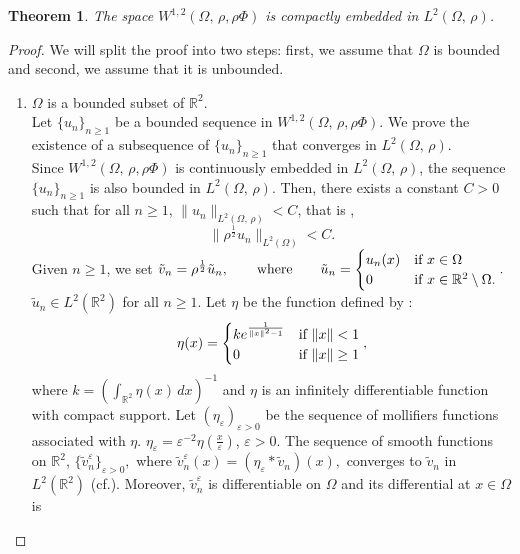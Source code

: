 \documentclass[11pt]{article}
\newtheorem{theorem}{Theorem}
\begin{document}
\begin{theorem}\label{th1}
	The space	$W^{1,2}(\Omega,\,  \rho, \rho \Phi)$ is compactly embedded in $L^2(\Omega,\,  \rho)$.
\end{theorem}
\begin{proof} We will split the proof into two steps: first, we assume that $\Omega$ is bounded and second, we assume that it is unbounded.
	\begin{enumerate}
		\item[Step 1.] $\Omega$ is a bounded subset of $\mathbb{R}^2$.\\
		Let $\{u_n\}_{n \geq 1}$ be a bounded sequence in $W^{1,2}(\Omega,\,  \rho, \rho \Phi)$. We prove the existence of a subsequence of $\{u_n\}_{n \geq 1}$ that converges in  $L^2(\Omega,\,  \rho)$.\\		
		Since $ W^{1,2}(\Omega,\,  \rho, \rho \Phi)$ is continuously embedded in $L^2(\Omega,\,  \rho)$, the sequence $\{u_n\}_{n \geq 1}$ is also bounded in $L^2(\Omega,\,  \rho)$. Then, there exists a constant  $C > 0$ such that for all $n \geq 1$, $\lVert u_n \rVert_{L^2(\Omega,\,  \rho)} < C$, that is ,
		\begin{equation}\label{3eq1}
			\lVert \rho^\frac{1}{2} u_n \rVert_{L^2(\Omega)} < C.
		\end{equation}
		Given  {$n \geq 1$}, we set 
		$ \tilde{v}_n = \rho^\frac{1}{2} \tilde{u}_n, \qquad \text{where} \qquad 
		\tilde{u}_n= \begin{cases}
			u_n(x) & \text{if $x \in \Omega$}\\
			0&  \text{if $ x\in \mathbb{R}^2 \setminus \Omega$}.
		\end{cases}.$\\
		$\tilde{u}_n \in L^2(\mathbb{R}^2)$ for all $n\geq 1$. Let $\eta$ be the function defined by :
		$$\eta(x) = \begin{cases}
			ke^{\frac{1}{ \lVert x\rVert^2 -1}} & \text{if $ \lVert x \rVert < 1 $}\\
			0 & \text{if $ \lVert x \rVert \geq 1$} 
		\end{cases},$$ where $k= \left(\int_{\mathbb{R}^2} \eta(x)\,dx \right)^{-1}$ and  {$\eta$} is an infinitely  differentiable function with compact support. Let {$(\eta_\varepsilon)_{\varepsilon>0}$ be the sequence of mollifiers functions associated with  {$\eta$}.  $\eta_\varepsilon =  \varepsilon^{-2} \eta\left( \frac{x}{\varepsilon} \right)$, $\varepsilon>0$}.   The sequence of smooth functions on $\mathbb{R}^2$, {$\{\tilde{v}_{n}^{\varepsilon}\}_{\varepsilon>0},$} where $\tilde{v}_{n}^{\varepsilon}(x) = (\eta_\varepsilon* \tilde{v}_n)(x),$ converges to $\tilde{v}_n$  in $L^2(\mathbb{R}^2)$ (cf.\cite[Theorem 2.29]{RA1}). Moreover, $\tilde{v}_{n}^{\varepsilon}$ is differentiable on $\Omega$ and its differential at $x\in\Omega$ is 
		

\end{enumerate}
\end{proof}
\end{document}

